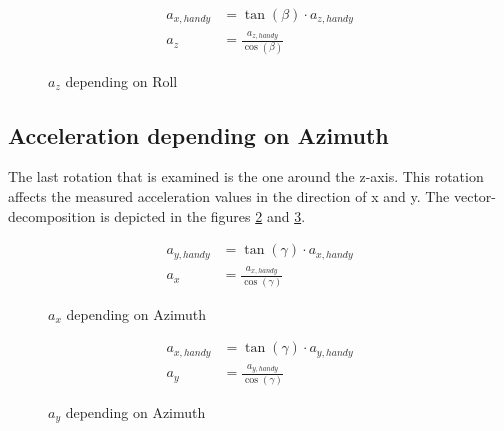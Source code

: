 \documentclass[12pt, a4paper, oneside, british]{article}
\begin{document}
\begin{figure}[htb]
    \centering
    \begin{minipage}{0.5\textwidth}
        \centering
        \captionsetup{justification=centering}
        
        \caption{$a_z$ depending on Roll}
        \label{fig:zRoll}
    \end{minipage}%
    \hfill
    \begin{minipage}{0.5\textwidth}
        \centering
			\begin{align} 
				a_{x, handy} &= \tan(\beta) \cdot a_{z, handy}\\ 
				a_z &= \frac{a_{z, handy}}{\cos(\beta)}
			\end{align}
    \end{minipage}
\end{figure}

\FloatBarrier
\subsection{Acceleration depending on Azimuth}
The last rotation that is examined is the one around the z-axis. This rotation
affects the measured acceleration values in the direction of x and y. The
vector-decomposition is depicted in the figures \ref{fig:xAzimuth} and
\ref{fig:yAzimuth}.

\begin{figure}[htb]
    \centering
    \begin{minipage}{0.5\textwidth}
        \centering
        \captionsetup{justification=centering}
        
        \caption{$a_x$ depending on Azimuth}
        \label{fig:xAzimuth}
    \end{minipage}%
    \hfill
    \begin{minipage}{0.5\textwidth}
        \centering
			\begin{align} 
				a_{y, handy} &= \tan(\gamma) \cdot {a_{x, handy}}\\
				a_x &= \frac{a_{x, handy}}{\cos(\gamma)}
			\end{align}
    \end{minipage}
\end{figure}

\begin{figure}[htb]
    \centering
    \begin{minipage}{0.5\textwidth}
        \centering
        \captionsetup{justification=centering}
        
        \caption{$a_y$ depending on Azimuth}
        \label{fig:yAzimuth}
    \end{minipage}%
    \hfill
    \begin{minipage}{0.5\textwidth}
        \centering
			\begin{align} 
				a_{x, handy} &= \tan(\gamma) \cdot a_{y, handy}\\ 
				a_y &= \frac{a_{y, handy}}{\cos(\gamma)}
			\end{align}
    \end{minipage}
\end{figure}
\end{document}
